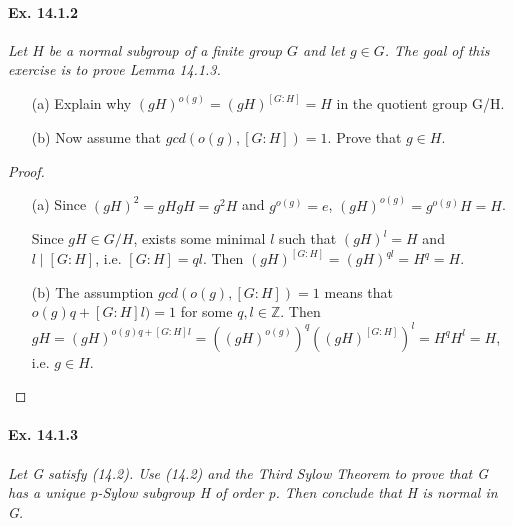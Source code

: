 \documentclass[11pt,a4paper]{article}
\begin{document}
\paragraph{Ex. 14.1.2}

{\it Let $H$ be a normal subgroup of a finite group $G$ and let $g\in G$. The goal of this exercise is to prove Lemma 14.1.3.
\begin{enumerate}
\item[(a)] Explain why $(gH)^{o(g)}=(gH)^{[G:H]}=H$ in the quotient group G/H.
\item[(b)] Now assume that $gcd(o(g),[G:H])=1$. Prove that $g\in H$.
\end{enumerate}
}
\begin{proof}
\begin{enumerate}
\item[(a)] Since $(gH)^2=gHgH=g^2H$ and $g^{o(g)}=e$, $(gH)^{o(g)}=g^{o(g)}H=H$.

Since $gH\in G/H$, exists some minimal $l$ such that $(gH)^l=H$ and $l\mid [G:H]$, i.e. $[G:H]=ql$. Then $(gH)^{[G:H]}=(gH)^{ql}=H^q=H$.
\item[(b)] The assumption $gcd(o(g),[G:H])=1$ means that $o(g)q+[G:H]l)=1$ for some $q,l\in\mathbb{Z}$. Then $gH=(gH)^{o(g)q+[G:H]l}=((gH)^{o(g)})^q((gH)^{[G:H]})^l=H^qH^l=H$, i.e. $g\in H$.
\end{enumerate}

\end{proof}

\paragraph{Ex. 14.1.3}

{\it Let G satisfy (14.2). Use (14.2) and the Third Sylow Theorem to prove that G has a unique p-Sylow subgroup H of order p. Then conclude that H is normal in G.
}
\end{document}
